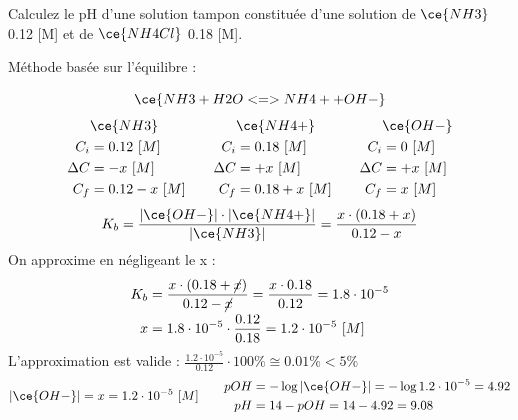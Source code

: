 \documentclass[
  11pt,
  french,
  a4paper,
  openany]{book}
\begin{document}
\begin{Exercise}
Calculez le pH d'une solution tampon constituée d'une solution de \(\ce{NH3}\) 0.12 {[}M{]} et de \(\ce{NH4Cl}\) 0.18 {[}M{]}.

\end{Exercise}

\begin{Answer}
Méthode basée sur l'équilibre :

\[
\ce{NH3 + H2O <=> NH4+ + OH-}
\]
\[
\begin{split}
&\ce{NH3}\\
C_i &= 0.12\ [M] \\
\Delta C &= - x\ [M] \\
C_f &= 0.12 - x\ [M] \\
\end{split}
\qquad
\begin{split}
&\ce{NH4+}\\
C_i &= 0.18\ [M] \\
\Delta C &= + x\ [M] \\
C_f &= 0.18 + x\ [M] \\
\end{split}
\qquad
\begin{split}
&\ce{OH-}\\
C_i &= 0\ [M] \\
\Delta C &= + x\ [M] \\
C_f &= x\ [M] \\
\end{split}
\]
\[
K_b = \frac{|\ce{OH-}| \cdot |\ce{NH4+}|}{|\ce{NH3}|} = \frac{x \cdot (0.18 + x)}{0.12 - x}
\]
On approxime en négligeant le x :
\[
\begin{split}
K_b &= \frac{x \cdot (0.18 + \cancel{x})}{0.12 - \cancel{x}} = \frac{x \cdot 0.18}{0.12} = 1.8 \cdot 10^{-5} \\
x &= 1.8 \cdot 10^{-5} \cdot \frac{0.12}{0.18} = 1.2 \cdot 10^{-5}\ [M]
\end{split}
\]
L'approximation est valide : \(\frac{1.2 \cdot 10^{-5}}{0.12} \cdot 100\% \cong 0.01\% < 5\%\)
\[
\begin{split}
|\ce{OH-}| = x = 1.2 \cdot 10^{-5}\ [M] 
\end{split}
\qquad
\begin{split}
pOH &= - \log |\ce{OH-}| = - \log 1.2 \cdot 10^{-5} = 4.92 \\
pH &= 14 - pOH = 14 - 4.92 = 9.08
\end{split}
\]


\end{Answer}
\end{document}
